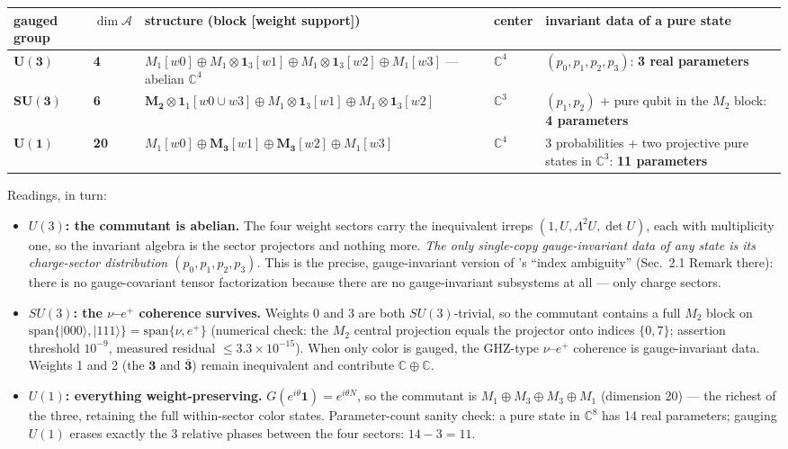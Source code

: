 \documentclass[11pt]{article}
\newcommand{\CC}{\mathbb{C}}
\newcommand{\Alg}{\mathcal{A}}
\begin{document}
\begin{center}
\small
\begin{tabular}{p{1.5cm}p{0.9cm}p{6.1cm}p{1.0cm}p{4.2cm}}
\hline
gauged group & $\dim \Alg$ & structure (block [weight support]) & center & invariant data of a pure state \\
\hline
$\boldsymbol{U(3)}$ & \textbf{4} & $M_1[w0] \oplus M_1{\otimes}\mathbf{1}_3[w1] \oplus M_1{\otimes}\mathbf{1}_3[w2] \oplus M_1[w3]$ --- abelian $\CC^4$ & $\CC^4$ & $(p_0, p_1, p_2, p_3)$: \textbf{3 real parameters} \\
$\boldsymbol{SU(3)}$ & \textbf{6} & $\boldsymbol{M_2}{\otimes}\mathbf{1}_1[w0 \cup w3] \oplus M_1{\otimes}\mathbf{1}_3[w1] \oplus M_1{\otimes}\mathbf{1}_3[w2]$ & $\CC^3$ & $(p_1, p_2)$ + pure qubit in the $M_2$ block: \textbf{4 parameters} \\
$\boldsymbol{U(1)}$ & \textbf{20} & $M_1[w0] \oplus \boldsymbol{M_3}[w1] \oplus \boldsymbol{M_3}[w2] \oplus M_1[w3]$ & $\CC^4$ & 3 probabilities + two projective pure states in $\CC^3$: \textbf{11 parameters} \\
\hline
\end{tabular}
\end{center}

Readings, in turn:

\begin{itemize}

\item \textbf{$U(3)$: the commutant is abelian.} The four weight sectors carry the inequivalent irreps $(1, U, \Lambda^2 U, \det U)$, each with multiplicity one, so the invariant algebra is the sector projectors and nothing more. \emph{The only single-copy gauge-invariant data of any state is its charge-sector distribution $(p_0, p_1, p_2, p_3)$.} This is the precise, gauge-invariant version of \cite{companion}'s ``index ambiguity'' (Sec.~2.1 Remark there): there is no gauge-covariant tensor factorization because there are no gauge-invariant subsystems at all --- only charge sectors.

\item \textbf{$SU(3)$: the $\nu$--$e^+$ coherence survives.} Weights 0 and 3 are both $SU(3)$-trivial, so the commutant contains a full $M_2$ block on $\mathrm{span}\{|000\rangle, |111\rangle\} = \mathrm{span}\{\nu, e^+\}$ (numerical check: the $M_2$ central projection equals the projector onto indices $\{0, 7\}$; assertion threshold $10^{-9}$, measured residual $\leq 3.3 \times 10^{-15}$). When only color is gauged, the GHZ-type $\nu$--$e^+$ coherence is gauge-invariant data. Weights 1 and 2 (the $\mathbf{3}$ and $\bar{\mathbf{3}}$) remain inequivalent and contribute $\CC \oplus \CC$.

\item \textbf{$U(1)$: everything weight-preserving.} $G(e^{i\theta}\mathbf{1}) = e^{i\theta N}$, so the commutant is $M_1 \oplus M_3 \oplus M_3 \oplus M_1$ (dimension 20) --- the richest of the three, retaining the full within-sector color states. Parameter-count sanity check: a pure state in $\CC^8$ has 14 real parameters; gauging $U(1)$ erases exactly the 3 relative phases between the four sectors: $14 - 3 = 11$. \checkmark

\end{itemize}
\end{document}
